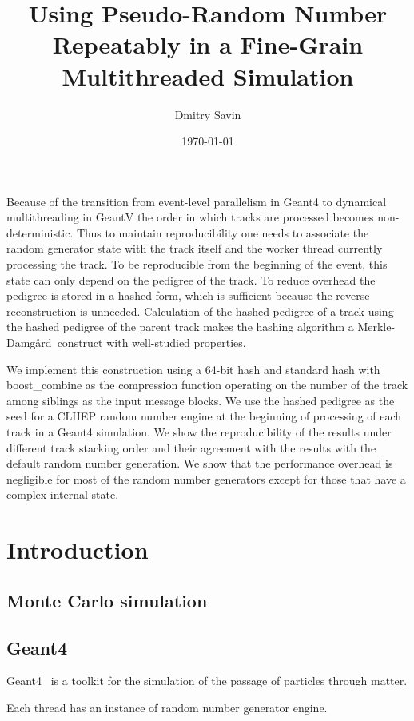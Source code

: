 \documentclass[a4paper, titlepage, 12pt]{article} %
\title{Using Pseudo-Random Number Repeatably in a Fine-Grain Multithreaded Simulation}
\author{Dmitry Savin}
\date{\today}
\newcommand{\MD}{Merkle-Damg\r{a}rd}
\begin{document}
 \maketitle
 
 \abstract
  Because of the transition from event-level parallelism in Geant4 to dynamical multithreading in GeantV the order in which tracks are processed becomes non-deterministic.
  Thus to maintain reproducibility one needs to associate the random generator state with the track itself and the worker thread currently processing the track.
  To be reproducible from the beginning of the event, this state can only depend on the pedigree of the track.
  To reduce overhead the pedigree is stored in a hashed form, which is sufficient because the reverse reconstruction is unneeded.
  Calculation of the hashed pedigree of a track using the hashed pedigree of the parent track makes the hashing algorithm a \MD\ construct with well-studied properties.
  
  We implement this construction using a 64-bit hash and standard hash with boost\_combine as the compression function operating on the number of the track among siblings as the input message blocks.
  We use the hashed pedigree as the seed for a CLHEP random number engine at the beginning of processing of each track in a Geant4 simulation.
  We show the reproducibility of the results under different track stacking order and their agreement with the results with the default random number generation.
  We show that the performance overhead is negligible for most of the random number generators except for those that have a complex internal state.
  
 \section{Introduction}
  \subsection{Monte Carlo simulation}
  \subsection{Geant4}
   Geant4~\cite{AGOSTINELLI2003250, 1610988, ALLISON2016186} is a toolkit for the simulation of the passage of particles through matter.
   
   
   \cite{GEANT4-MT}
   Each thread has an instance of random number generator engine.
   
\end{document}
